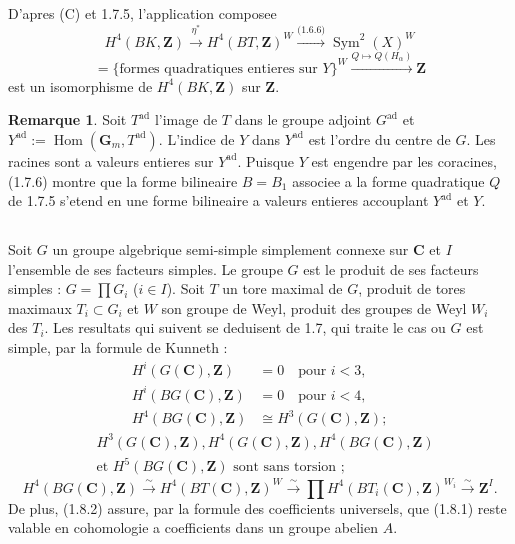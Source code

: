 \documentclass[11pt,a4paper]{article}
\theoremstyle{plain}
\theoremstyle{definition}
\newtheorem{remark}[theorem]{Remarque}
\DeclareMathOperator{\Sym}{Sym}
\DeclareMathOperator{\Hom}{Hom}
\DeclareMathOperator{\ad}{ad}
\begin{document}
D'apres (C) et 1.7.5, l'application composee
\begin{equation}\label{1.7.7}
H^4(BK, \mathbf{Z}) \xrightarrow{\eta^*} H^4(BT, \mathbf{Z})^W \xrightarrow{\text{(1.6.6)}} \Sym^2(X)^W
\end{equation}
\[
= \{\text{formes quadratiques entieres sur } Y\}^W \xrightarrow{Q \mapsto Q(H_\alpha)} \mathbf{Z}
\]
est un isomorphisme de $H^4(BK, \mathbf{Z})$ sur $\mathbf{Z}$.

\begin{remark}\label{1.7.8}
Soit $T^{\ad}$ l'image de $T$ dans le groupe adjoint $G^{\ad}$ et $Y^{\ad} := \Hom(\mathbf{G}_m, T^{\ad})$. L'indice de $Y$ dans $Y^{\ad}$ est l'ordre du centre de $G$. Les racines sont a valeurs entieres sur $Y^{\ad}$. Puisque $Y$ est engendre par les coracines, (1.7.6) montre que la forme bilineaire $B = B_1$ associee a la forme quadratique $Q$ de 1.7.5 s'etend en une forme bilineaire a valeurs entieres accouplant $Y^{\ad}$ et $Y$.
\end{remark}

\subsection{}\label{1.8}

Soit $G$ un groupe algebrique semi-simple simplement connexe sur $\mathbf{C}$ et $I$ l'ensemble de ses facteurs simples. Le groupe $G$ est le produit de ses facteurs simples : $G = \prod G_i$ ($i \in I$). Soit $T$ un tore maximal de $G$, produit de tores maximaux $T_i \subset G_i$ et $W$ son groupe de Weyl, produit des groupes de Weyl $W_i$ des $T_i$. Les resultats qui suivent se deduisent de 1.7, qui traite le cas ou $G$ est simple, par la formule de Kunneth :
\begin{equation}\label{1.8.1}
\begin{aligned}
H^i(G(\mathbf{C}), \mathbf{Z}) &= 0 \quad \text{pour } i < 3, \\
H^i(BG(\mathbf{C}), \mathbf{Z}) &= 0 \quad \text{pour } i < 4, \\
H^4(BG(\mathbf{C}), \mathbf{Z}) &\cong H^3(G(\mathbf{C}), \mathbf{Z});
\end{aligned}
\end{equation}
\begin{equation}\label{1.8.2}
\begin{aligned}
&H^3(G(\mathbf{C}), \mathbf{Z}), H^4(G(\mathbf{C}), \mathbf{Z}), H^4(BG(\mathbf{C}), \mathbf{Z}) \\
&\text{et } H^5(BG(\mathbf{C}), \mathbf{Z}) \text{ sont sans torsion ;}
\end{aligned}
\end{equation}
\begin{equation}\label{1.8.3}
H^4(BG(\mathbf{C}), \mathbf{Z}) \xrightarrow{\sim} H^4(BT(\mathbf{C}), \mathbf{Z})^W \xrightarrow{\sim} \prod H^4(BT_i(\mathbf{C}), \mathbf{Z})^{W_i} \xrightarrow{\sim} \mathbf{Z}^I.
\end{equation}
De plus, (1.8.2) assure, par la formule des coefficients universels, que (1.8.1) reste valable en cohomologie a coefficients dans un groupe abelien $A$.
\end{document}

